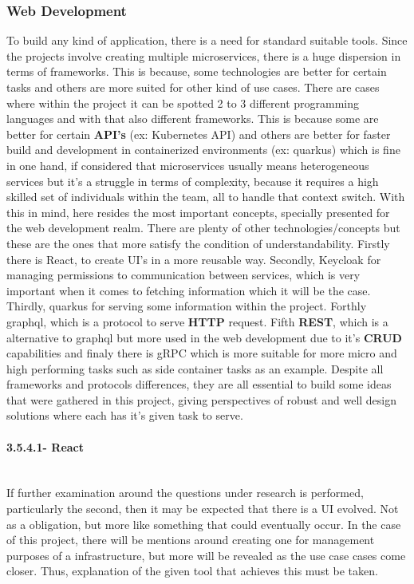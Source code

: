 \subsubsection{Web Development}
To build any kind of application, there is a need for standard suitable tools. Since the projects involve creating multiple microservices, there is a huge dispersion in terms of frameworks. This is because, some technologies are better for certain tasks and others are more suited for other kind of use cases. There are cases where within the project it can be spotted 2 to 3 different programming languages and with that also different frameworks. This is because some are better for certain \textbf{API's} (ex: Kubernetes API) and others are better for faster build and development in containerized environments (ex: quarkus) which is fine in one hand, if considered that microservices usually means heterogeneous services but it's a struggle in terms of complexity, because it requires a high skilled set of individuals within the team, all to handle that context switch.
    With this in mind, here resides the most important concepts, specially presented for the web development realm. There are plenty of other technologies/concepts but these are the ones that more satisfy the condition of understandability.  Firstly there is React, to create UI's in a more reusable way. Secondly, Keycloak for managing permissions to communication between services, which is very important when it comes to fetching information which it will be the case. Thirdly, quarkus for serving some information within the project. Forthly graphql, which is a protocol to serve \textbf{HTTP} request. Fifth \textbf{REST}, which is a alternative to graphql but more used in the web development due to it's \textbf{CRUD} capabilities and finaly there is gRPC which is more suitable for more micro and high performing tasks such as side container tasks as an example.
Despite all frameworks and protocols differences, they are all essential to build some ideas that were gathered in this project, giving perspectives of robust and well design solutions where each has it's given task to serve.

\paragraph{3.5.4.1- React}\mbox{}\\
If further examination around the questions under research is performed, particularly the second, then it may be expected that there is a UI evolved. Not as a obligation, but more like something that could eventually occur. In the case of this project, there will be mentions around creating one for management purposes of a infrastructure, but more will be revealed as the use case cases come closer. Thus, explanation of the given tool that achieves this must be taken.

